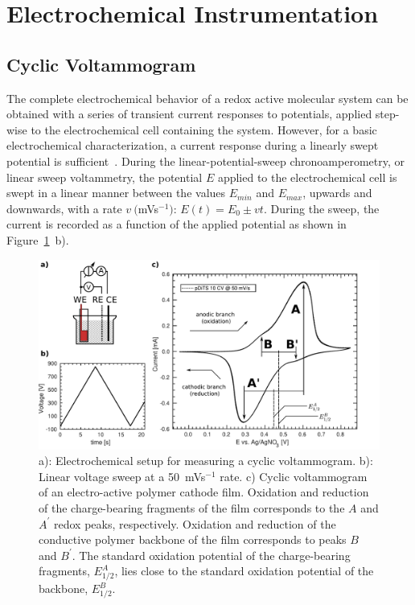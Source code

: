 \section{Electrochemical Instrumentation}
\subsection{Cyclic Voltammogram}
The complete electrochemical behavior of a redox active molecular system can be obtained with a series of transient current responses to potentials, applied step-wise to the electrochemical cell containing the system. However, for a basic electrochemical characterization, a current response during a linearly swept potential is sufficient~\cite{Bard_book}. During the linear-potential-sweep chronoamperometry, or linear sweep voltammetry, the potential $E$ applied to the electrochemical cell is swept in a linear manner between the values $E_{min}$ and $E_{max}$, upwards and downwards, with a rate $v~($mVs$^{-1})$: $E(t) = E_0\pm vt$. During the sweep, the current is recorded as a function of the applied potential as shown in Figure~\ref{fig:CV_DiTBuS}~b).\\ 

\begin{figure}[h]
\center
	\includegraphics[width=1\textwidth]{./electrochemistry/figures/CV_pDiTBuS.pdf}
	\caption{a): Electrochemical setup for measuring a cyclic voltammogram. b): Linear voltage sweep at a 50~mVs$^{-1}$ rate. c) Cyclic voltammogram of an electro-active polymer cathode film. Oxidation and reduction of the charge-bearing fragments of the film corresponds to the $A$ and $A^\prime$ redox peaks, respectively. Oxidation and reduction of the conductive polymer backbone of the film corresponds to peaks $B$ and $B^\prime$. The standard oxidation potential of the charge-bearing fragments, $E_{1/2}^A$, lies close to the standard oxidation potential of the backbone, $E_{1/2}^B$.}
	\label{fig:CV_DiTBuS}
\end{figure}

